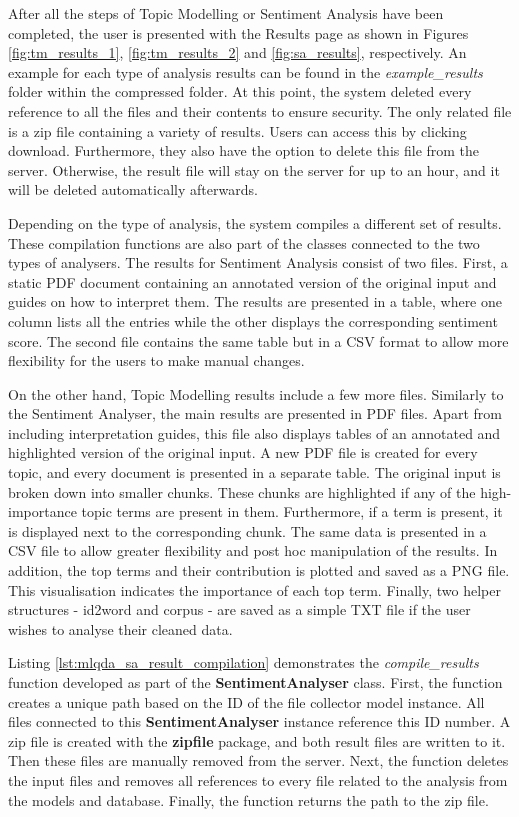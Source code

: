 \documentclass{l4proj}
\begin{document}
After all the steps of Topic Modelling or Sentiment Analysis have been completed, the user is presented with the Results page as shown in Figures \ref{fig:tm_results_1}, \ref{fig:tm_results_2} and \ref{fig:sa_results}, respectively. An example for each type of analysis results can be found in the \textit{example\_results} folder within the compressed folder. At this point, the system deleted every reference to all the files and their contents to ensure security. The only related file is a zip file containing a variety of results. Users can access this by clicking download. Furthermore, they also have the option to delete this file from the server. Otherwise, the result file will stay on the server for up to an hour, and it will be deleted automatically afterwards.

Depending on the type of analysis, the system compiles a different set of results. These compilation functions are also part of the classes connected to the two types of analysers. The results for Sentiment Analysis consist of two files. First, a static PDF document containing an annotated version of the original input and guides on how to interpret them. The results are presented in a table, where one column lists all the entries while the other displays the corresponding sentiment score. The second file contains the same table but in a CSV format to allow more flexibility for the users to make manual changes.

On the other hand, Topic Modelling results include a few more files. Similarly to the Sentiment Analyser, the main results are presented in PDF files. Apart from including interpretation guides, this file also displays tables of an annotated and highlighted version of the original input. A new PDF file is created for every topic, and every document is presented in a separate table. The original input is broken down into smaller chunks. These chunks are highlighted if any of the high-importance topic terms are present in them. Furthermore, if a term is present, it is displayed next to the corresponding chunk. The same data is presented in a CSV file to allow greater flexibility and post hoc manipulation of the results. In addition, the top terms and their contribution is plotted and saved as a PNG file. This visualisation indicates the importance of each top term. Finally, two helper structures - id2word and corpus - are saved as a simple TXT file if the user wishes to analyse their cleaned data. 

Listing \ref{lst:mlqda_sa_result_compilation} demonstrates the \textit{compile\_results} function developed as part of the \textbf{SentimentAnalyser} class. First, the function creates a unique path based on the ID of the file collector model instance. All files connected to this \textbf{SentimentAnalyser} instance reference this ID number. A zip file is created with the \textbf{zipfile} package, and both result files are written to it. Then these files are manually removed from the server. Next, the function deletes the input files and removes all references to every file related to the analysis from the models and database. Finally, the function returns the path to the zip file.
\end{document}
